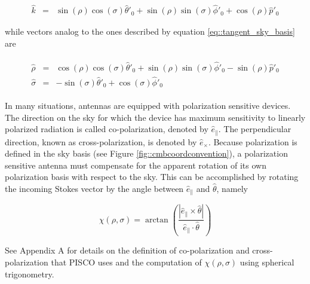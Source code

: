 \documentclass[a4paper,11pt]{article}
\newcommand{\co}{\mathbin{\|}}
\newcommand{\cx}{\mathbin{\times}}
\begin{document}
\begin{equation}
\begin{aligned}
\hat{k}       &=&  \sin(\rho)\cos(\sigma)\hat{\theta}'_0 + \sin(\rho)\sin(\sigma) \hat{\phi}'_0 + \cos(\rho) \hat{p}'_0 
\end{aligned}
\end{equation}

\noindent
while vectors analog to the ones described by equation \ref{eq::tangent_sky_basis} are

\begin{eqnarray}
\begin{aligned}
\hat{\rho}    &=&  \cos(\rho)\cos(\sigma)\hat{\theta}'_0 + \sin(\rho)\sin(\sigma) \hat{\phi}'_0 - \sin(\rho) \hat{p}'_0 \\
\hat{\sigma}  &=& -\sin(\sigma)\hat{\theta}'_0 + \cos(\sigma)\hat{\phi}'_0
\end{aligned}
\end{eqnarray}

In many situations, antennas are equipped with polarization sensitive devices. The direction on the sky for which the device has maximum sensitivity to linearly polarized radiation is called co-polarization, denoted by $\hat{e}_{\co}$. The perpendicular direction, known as cross-polarization, is denoted by $\hat{e}_{\cx}$.
Because polarization is defined in the sky basis (see Figure \ref{fig::cmbcoordconvention}), a polarization sensitive antenna must compensate for the apparent rotation of its own polarization basis with respect to the sky. This can be accomplished by rotating the incoming Stokes vector by the angle between $\hat{e}_{\co}$ and $\hat{\theta}$, namely

\begin{equation}
\chi(\rho,\sigma) = \arctan \left( \frac{ |\hat{e}_{\co} \times \hat{\theta}| }{ \hat{e}_{\co} \cdot \hat{\theta} } \right)
\label{eq::psi}
\end{equation}

See Appendix A for details on the definition of co-polarization and cross-polarization that PISCO uses and the computation of $\chi(\rho,\sigma)$ using spherical trigonometry.
\end{document}
